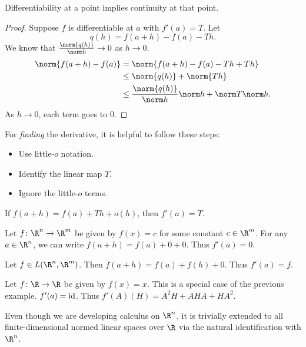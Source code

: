 \begin{proposition}
    Differentiability at a point implies continuity at that point.
\end{proposition}
\begin{proof}
    Suppose $f$ is differentiable at $a$ with $f'(a) = T$.
    Let \[
        q(h) = f(a + h) - f(a) - Th.
    \] We know that $\frac{\norm{q(h)}}{\norm h} \to 0$ as $h \to 0$.
    \begin{align*}
        \norm{f(a + h) - f(a)}
            &= \norm{f(a+h) - f(a) - Th + Th} \\
            &\le \norm{q(h)} + \norm{Th} \\
            &\le \frac{\norm{q(h)}}{\norm h} \norm h + \norm T \norm h.
    \end{align*}
    As $h \to 0$, each term goes to $0$.
\end{proof}

For \emph{finding} the derivative, it is helpful to follow these steps:
\begin{itemize}
    \item Use little-$o$ notation.
    \item Identify the linear map $T$.
    \item Ignore the little-$o$ terms.
\end{itemize}
If $f(a + h) = f(a) + Th + o(h)$, then $f'(a) = T$.

\begin{examples}
    \item Let $f\colon \R^n \to \R^m$ be given by $f(x) = c$
        for some constant $c \in \R^m$.
        For any $a \in \R^n$, we can write
        $f(a + h) = f(a) + 0 + 0$.
        Thus $f'(a) = 0$.
    \item Let $f \in L(\R^n, \R^m)$.
        Then $f(a + h) = f(a) + f(h) + 0$.
        Thus $f'(a) = f$.
    \item Let $f\colon \R \to \R$ be given by $f(x) = x$.
        This is a special case of the previous example.
        $f'(a) = \operatorname{id}$.
    Thus $f'(A)(H) = A^2 H + A H A + H A^2$.
\end{examples}

Even though we are developing calculus on $\R^n$, it is trivially extended
to all finite-dimensional normed linear spaces over $\R$ via the natural
identification with $\R^n$.
